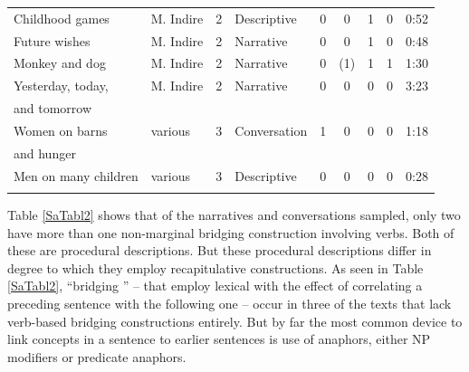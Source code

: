 \documentclass[output=paper]{LSP/langsci}
\begin{document}
\begin{table}
\begin{tabular}{llclccrcS[table-format=1.2,input-decimal-markers={:},output-decimal-marker = {:}]}
Childhood games            & M. Indire        & 2     & Descriptive    & 0                    & 0                     & 1                & 0                  & 0:52             \\
Future wishes              & M. Indire        & 2     & Narrative      & 0                    & 0                     & 1                & 0                  & 0:48             \\
Monkey and dog             & M. Indire        & 2     & Narrative      & 0                    & (1)                   & 1                & 1                  & 1:30             \\
Yesterday, today,  & M. Indire        & 2     & Narrative      & 0                    & 0                     & 0                & 0                  & 3:23             \\
and tomorrow &         &      &       &                     &                      &                 &                   &             \\
Women on barns   & various          & 3       & Conversation  & 1                    & 0                     & 0                & 0                  & 1:18             \\
 and hunger  &           &        &   &                     &                      &                 &                   &           \\
Men on many children       & various          & 3      & Descriptive    & 0                    & 0                     & 0                & 0                  & 0:28        \\  
\lspbottomrule  
\end{tabular}
\end{table}
%
 
Table \ref{SaTabl2} shows that of the narratives and conversations sampled, only two have more than one non-marginal bridging construction involving verbs. Both of these are procedural descriptions. But these procedural descriptions differ in degree to which they employ recapitulative constructions. As seen in Table \ref{SaTabl2}, ``bridging '' --  that employ lexical  with the effect of correlating a preceding sentence with the following one -- occur in three of the texts that lack verb-based bridging constructions entirely. But by far the most common device to link concepts in a sentence to earlier sentences is use of anaphors, either NP modifiers or predicate anaphors. 
\end{document}
